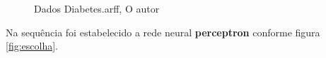 \begin{figure}[H] %
  \center
  \caption{Dados Diabetes.arff, O autor}\label{fig:dados}
\end{figure}
\par Na sequência foi estabelecido a rede neural \textbf{perceptron} conforme figura \ref{fig:escolha}.

